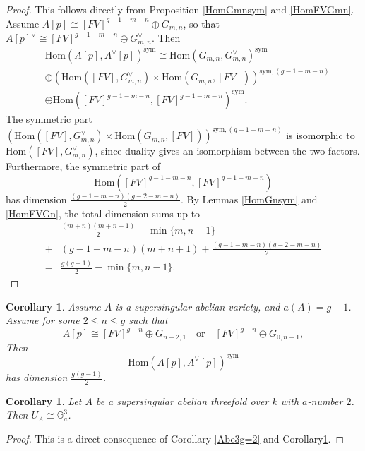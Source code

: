 \documentclass[a4paper,12pt,twoside]{report}
\newtheorem{corollary}[theorem]{Corollary}
\newcommand{\G}{\mathbb{G}}
\newcommand{\Hom}{\mathrm{Hom}}
\newcommand{\sym}{\mathrm{sym}}
\begin{document}
\begin{proof}
    This follows directly from Proposition \ref{HomGmnsym} and \ref{HomFVGmn}. 
    Assume $A[p]\cong  [FV]^{g-1-m-n}\oplus G_{m,n}$,
    so that $A[p]^\vee\cong [FV]^{g-1-m-n}\oplus G_{m,n}^\vee$. 
    Then  
    \begin{equation}
        \begin{aligned}
        &\Hom(A[p],A^\vee[p])^{\sym} \cong \Hom(G_{m,n},G_{m,n}^\vee)^{\sym} \\
        &\oplus (\Hom([FV],G_{m,n}^\vee)\times \Hom(G_{m,n},[FV]))^{\sym,(g-1-m-n)}\\
        &\oplus \Hom([FV]^{g-1-m-n},[FV]^{g-1-m-n})^{\sym}.
        \end{aligned}
    \end{equation}
The symmetric part $(\Hom([FV],G_{m,n}^\vee)\times \Hom(G_{m,n},[FV]))^{\sym,(g-1-m-n)}$ is isomorphic to 
$\Hom([FV],G_{m,n}^\vee)$, 
since duality gives an isomorphism between the two factors. 
Furthermore, the symmetric part of \[\Hom([FV]^{g-1-m-n},[FV]^{g-1-m-n})\]
has dimension $\frac{(g-1-m-n)(g-2-m-n)}{2}$. 
By Lemmas \ref{HomGnsym} and \ref{HomFVGn}, the total dimension sums up to
\[\begin{aligned}
    &\frac{(m+n)(m+n+1)}{2}-\min\{m,n-1\}\\
    +&(g-1-m-n)(m+n+1)+\frac{(g-1-m-n)(g-2-m-n)}{2}\\
    =&\frac{g(g-1)}{2}-\min\{m,n-1\}.
\end{aligned} \]
\end{proof}

\begin{corollary}\label{almostsuperspecial}
    Assume $A$ is a supersingular abelian variety, and $a(A)=g-1$. 
    Assume for some $2\leqslant n\leqslant g$ 
    such that \[A[p]\cong [FV]^{g-n}\oplus G_{n-2,1} \quad \text{or} \quad [FV]^{g-n}\oplus G_{0,n-1},\]
    Then \[\Hom(A[p],A^\vee[p])^{\sym}\] 
    has dimension $\frac{g(g-1)}{2}$. 
\end{corollary}

\begin{corollary}
    Let $A$ be a supersingular abelian threefold over $k$ with $a$-number $2$. 
    Then $U_A\cong \G_a^3$.  
\end{corollary}

\begin{proof}
    This is a direct consequence of Corollary \ref{Abe3g=2} and Corollary\ref{almostsuperspecial}.  
\end{proof}
\end{document}
